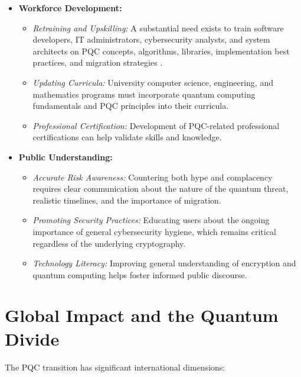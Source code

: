 \begin{itemize}
    \item \textbf{Workforce Development:}
    \begin{itemize}
        \item \textit{Retraining and Upskilling:} A substantial need exists to train software developers, IT administrators, cybersecurity analysts, and system architects on PQC concepts, algorithms, libraries, implementation best practices, and migration strategies \parencite{pqc_workforce_report}.
        \item \textit{Updating Curricula:} University computer science, engineering, and mathematics programs must incorporate quantum computing fundamentals and PQC principles into their curricula.
        \item \textit{Professional Certification:} Development of PQC-related professional certifications can help validate skills and knowledge.
    \end{itemize}
    \item \textbf{Public Understanding:}
    \begin{itemize}
        \item \textit{Accurate Risk Awareness:} Countering both hype and complacency requires clear communication about the nature of the quantum threat, realistic timelines, and the importance of migration.
        \item \textit{Promoting Security Practices:} Educating users about the ongoing importance of general cybersecurity hygiene, which remains critical regardless of the underlying cryptography.
        \item \textit{Technology Literacy:} Improving general understanding of encryption and quantum computing helps foster informed public discourse.
    \end{itemize}
\end{itemize}

\section{Global Impact and the Quantum Divide}\label{sec:global_ch9}

The PQC transition has significant international dimensions:

